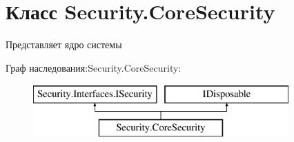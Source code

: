 \hypertarget{class_security_1_1_core_security}{}\section{Класс Security.\+Core\+Security}
\label{class_security_1_1_core_security}


Представляет ядро системы  


Граф наследования\+:Security.\+Core\+Security\+:\begin{figure}[H]
\begin{center}
\leavevmode
\includegraphics[height=2.000000cm]{d8/daf/class_security_1_1_core_security}
\end{center}
\end{figure}
